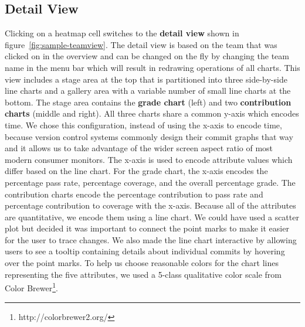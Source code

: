 \documentclass[../manifest.tex]{subfiles}
\begin{document}
\subsection{Detail View}

Clicking on a heatmap cell switches to the \textbf{detail view} shown in figure~\ref{fig:sample-teamview}. The detail view is based on the team that was clicked on in the overview and can be changed on the fly by changing the team name in the menu bar which will result in redrawing operations of all charts. This view includes a stage area at the top that is partitioned into three side-by-side line charts and a gallery area with a variable number of small line charts at the bottom. The stage area contains the \textbf{grade chart} (left) and two \textbf{contribution charts} (middle and right). All three charts share a common y-axis which encodes time. We chose this configuration, instead of using the x-axis to encode time, because version control systems commonly design their commit graphs that way and it allows us to take advantage of the wider screen aspect ratio of most modern consumer monitors. The x-axis is used to encode attribute values which differ based on the line chart. For the grade chart, the x-axis encodes the percentage pass rate, percentage coverage, and the overall percentage grade. The contribution charts encode the percentage contribution to pass rate and percentage contribution to coverage with the x-axis. Because all of the attributes are quantitative, we encode them using a line chart. We could have used a scatter plot but decided it was important to connect the point marks to make it easier for the user to trace changes. We also made the line chart interactive by allowing users to see a tooltip containing details about individual commits by hovering over the point marks. To help us choose reasonable colors for the chart lines representing the five attributes, we used a 5-class qualitative color scale from Color Brewer\footnote{http://colorbrewer2.org/}.
\end{document}
